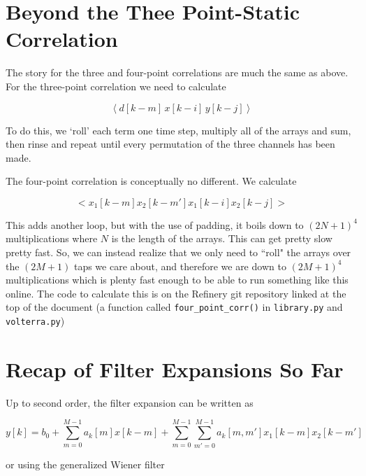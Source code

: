 \documentclass{article}
\begin{document}
\section{Beyond the Thee Point-Static Correlation}
The story for the three and four-point correlations are much the same as above.
For the three-point correlation we need to calculate

\begin{equation}
    \left<d[k-m]\,x[k-i]\,y[k-j]\right>
\end{equation}

To do this, we `roll' each term one time step, multiply all of the arrays and sum,
then rinse and repeat until every permutation of the three channels has been made.

The four-point correlation is conceptually no different. We calculate

\begin{equation}
    \bigg<x_1[k-m]x_2[k-m'] x_1[k-i]x_2[k-j]\bigg>
\end{equation}

This adds another loop, but with the use of padding, it boils down to 
$(2N+1)^4$ multiplications where $N$ is the length of the arrays. This can get
pretty slow pretty fast. So, we can instead realize that we only need to
``roll" the arrays over the $(2M+1)$ taps we care about, and therefore we are
down to $(2M+1)^4$ multiplications which is plenty fast enough to be able to run
something like this online. The code to calculate this is on the
Refinery git repository linked at the top of the document (a function called
\texttt{four\_point\_corr()} in \texttt{library.py} and \texttt{volterra.py})


\section{Recap of Filter Expansions So Far}
Up to second order, the filter expansion can be written as

\begin{equation}
    y[k] = b_0 + \sum_{m=0}^{M-1} a_k[m] x[k-m]
    + \sum_{m=0}^{M-1}\sum_{m'=0}^{M-1} a_k[m, m']x_1[k-m]x_2[k-m']
\end{equation}

or using the generalized Wiener filter
\end{document}
